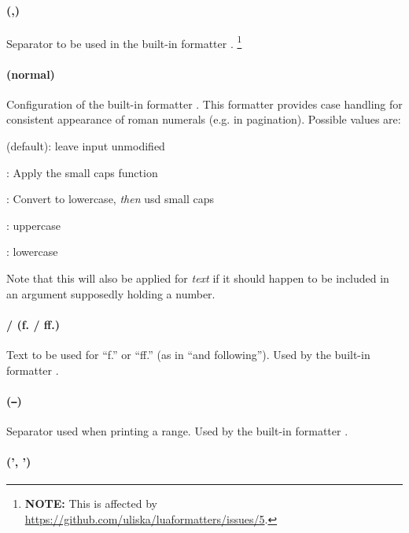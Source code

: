 \documentclass[12pt]{scrartcl}
\begin{document}
\paragraph{ (,)}

Separator to be used in the built-in formatter .%
\footnote{\textbf{NOTE:} This is affected by
\url{https://github.com/uliska/luaformatters/issues/5}.}


\paragraph{ (normal)}

Configuration of the built-in formatter .  This formatter
provides case handling for consistent appearance of roman numerals (e.g. in
pagination).  Possible values are:

\begin{itemize*}
\item {} (default): leave input unmodified
\item {}: Apply the small caps function
\item {}: Convert to lowercase, \emph{then} usd small caps
\item {}: uppercase
\item {}: lowercase
\end{itemize*}

\noindent Note that this will also be applied for \emph{text} if it should
happen to be included in an argument supposedly holding a number.

\paragraph{ /  (f. / ff.)}

Text to be used for “f.” or “ff.” (as in “and following”).  Used by the built-in formatter .


\paragraph{ (\texttt{--})}

Separator used when printing a range.  Used by the built-in formatter .


\paragraph{ (', ')}
\end{document}

